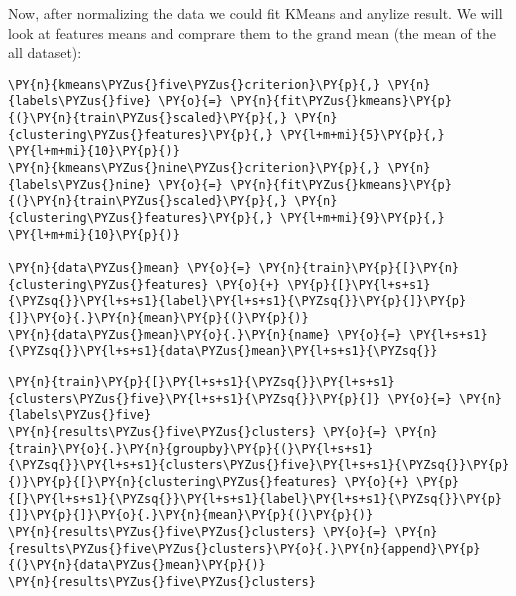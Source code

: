     Now, after normalizing the data we could fit KMeans and anylize result.
We will look at features means and comprare them to the grand mean (the
mean of the all dataset):

    \begin{tcolorbox}[breakable, size=fbox, boxrule=1pt, pad at break*=1mm,colback=cellbackground, colframe=cellborder]
\begin{Verbatim}[commandchars=\\\{\}]
\PY{n}{kmeans\PYZus{}five\PYZus{}criterion}\PY{p}{,} \PY{n}{labels\PYZus{}five} \PY{o}{=} \PY{n}{fit\PYZus{}kmeans}\PY{p}{(}\PY{n}{train\PYZus{}scaled}\PY{p}{,} \PY{n}{clustering\PYZus{}features}\PY{p}{,} \PY{l+m+mi}{5}\PY{p}{,} \PY{l+m+mi}{10}\PY{p}{)}
\PY{n}{kmeans\PYZus{}nine\PYZus{}criterion}\PY{p}{,} \PY{n}{labels\PYZus{}nine} \PY{o}{=} \PY{n}{fit\PYZus{}kmeans}\PY{p}{(}\PY{n}{train\PYZus{}scaled}\PY{p}{,} \PY{n}{clustering\PYZus{}features}\PY{p}{,} \PY{l+m+mi}{9}\PY{p}{,} \PY{l+m+mi}{10}\PY{p}{)}

\PY{n}{data\PYZus{}mean} \PY{o}{=} \PY{n}{train}\PY{p}{[}\PY{n}{clustering\PYZus{}features} \PY{o}{+} \PY{p}{[}\PY{l+s+s1}{\PYZsq{}}\PY{l+s+s1}{label}\PY{l+s+s1}{\PYZsq{}}\PY{p}{]}\PY{p}{]}\PY{o}{.}\PY{n}{mean}\PY{p}{(}\PY{p}{)}
\PY{n}{data\PYZus{}mean}\PY{o}{.}\PY{n}{name} \PY{o}{=} \PY{l+s+s1}{\PYZsq{}}\PY{l+s+s1}{data\PYZus{}mean}\PY{l+s+s1}{\PYZsq{}}
\end{Verbatim}
\end{tcolorbox}

    \begin{tcolorbox}[breakable, size=fbox, boxrule=1pt, pad at break*=1mm,colback=cellbackground, colframe=cellborder]
\begin{Verbatim}[commandchars=\\\{\}]
\PY{n}{train}\PY{p}{[}\PY{l+s+s1}{\PYZsq{}}\PY{l+s+s1}{clusters\PYZus{}five}\PY{l+s+s1}{\PYZsq{}}\PY{p}{]} \PY{o}{=} \PY{n}{labels\PYZus{}five}
\PY{n}{results\PYZus{}five\PYZus{}clusters} \PY{o}{=} \PY{n}{train}\PY{o}{.}\PY{n}{groupby}\PY{p}{(}\PY{l+s+s1}{\PYZsq{}}\PY{l+s+s1}{clusters\PYZus{}five}\PY{l+s+s1}{\PYZsq{}}\PY{p}{)}\PY{p}{[}\PY{n}{clustering\PYZus{}features} \PY{o}{+} \PY{p}{[}\PY{l+s+s1}{\PYZsq{}}\PY{l+s+s1}{label}\PY{l+s+s1}{\PYZsq{}}\PY{p}{]}\PY{p}{]}\PY{o}{.}\PY{n}{mean}\PY{p}{(}\PY{p}{)}
\PY{n}{results\PYZus{}five\PYZus{}clusters} \PY{o}{=} \PY{n}{results\PYZus{}five\PYZus{}clusters}\PY{o}{.}\PY{n}{append}\PY{p}{(}\PY{n}{data\PYZus{}mean}\PY{p}{)}
\PY{n}{results\PYZus{}five\PYZus{}clusters}
\end{Verbatim}
\end{tcolorbox}

